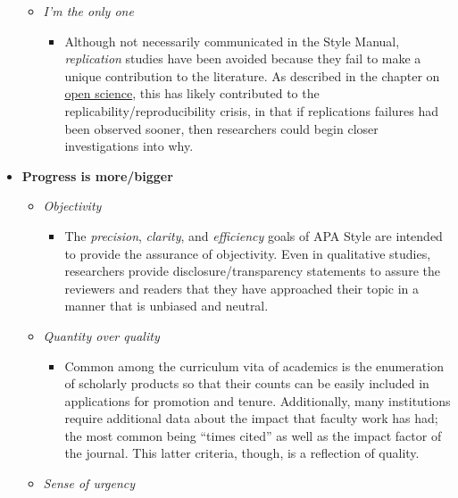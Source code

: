 \documentclass[
  11pt,
]{book}
\providecommand{\tightlist}{%
  \setlength{\itemsep}{0pt}\setlength{\parskip}{0pt}}
\begin{document}
\begin{itemize}
  \begin{itemize}
  \tightlist
  \item
    \emph{I'm the only one}

    \begin{itemize}
    \tightlist
    \item
      Although not necessarily communicated in the Style Manual, \emph{replication} studies have been avoided because they fail to make a unique contribution to the literature. As described in the chapter on \protect\hyperlink{OpSci}{open science}, this has likely contributed to the replicability/reproducibility crisis, in that if replications failures had been observed sooner, then researchers could begin closer investigations into why.
    \end{itemize}
  \end{itemize}
\item
  \textbf{Progress is more/bigger}

  \begin{itemize}
  \tightlist
  \item
    \emph{Objectivity}

    \begin{itemize}
    \tightlist
    \item
      The \emph{precision}, \emph{clarity}, and \emph{efficiency} goals of APA Style are intended to provide the assurance of objectivity. Even in qualitative studies, researchers provide disclosure/transparency statements to assure the reviewers and readers that they have approached their topic in a manner that is unbiased and neutral.
    \end{itemize}
  \item
    \emph{Quantity over quality}

    \begin{itemize}
    \tightlist
    \item
      Common among the curriculum vita of academics is the enumeration of scholarly products so that their counts can be easily included in applications for promotion and tenure. Additionally, many institutions require additional data about the impact that faculty work has had; the most common being ``times cited'' as well as the impact factor of the journal. This latter criteria, though, is a reflection of quality.
    \end{itemize}
  \item
    \emph{Sense of urgency}


\end{itemize}
\end{itemize}
\end{document}
